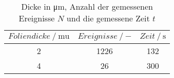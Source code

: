 \begin{table}[H] 
   \centering 
   \caption{Dicke in \si{\micro \meter}, Anzahl der gemessenen Ereignisse $N$ und die gemessene Zeit $t$} 
   \label{tab:foliendicke} 
   \begin{tabular} { c c c } 
 \toprule 
 {$Foliendicke\:/\: \mathrm{mu}$} & {$Ereignisse\:/\: \mathrm{-}$} & {$Zeit\:/\: \mathrm{s}$} \\ 
    \midrule 
    2 & 1226 & 132 \\ 
    4 & 26 & 300 \\ 
    \bottomrule 
  \end{tabular}
\end{table}